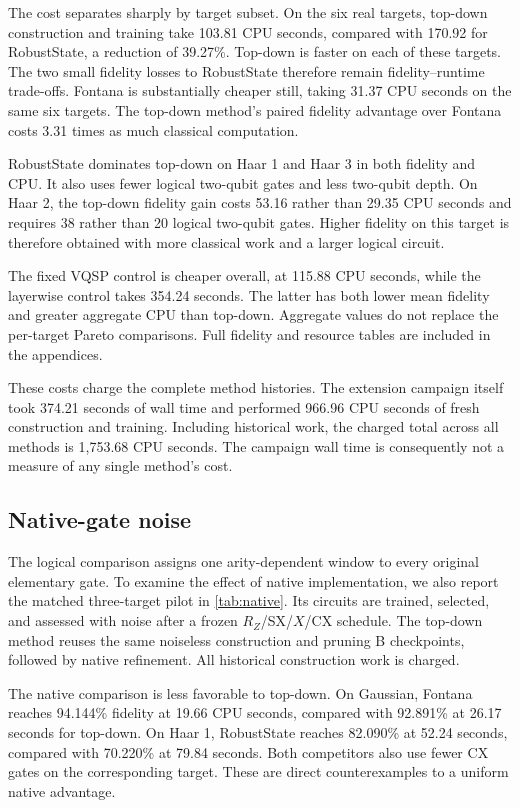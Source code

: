 The cost separates sharply by target subset. On the six real targets,
top-down construction and training take 103.81 CPU seconds, compared with
170.92 for RobustState, a reduction of 39.27\%. Top-down is faster on each
of these targets. The two small fidelity losses to RobustState therefore
remain fidelity--runtime trade-offs. Fontana is substantially cheaper
still, taking 31.37 CPU seconds on the same six targets. The top-down
method's paired fidelity advantage over Fontana costs 3.31 times as much
classical computation.

RobustState dominates top-down on Haar 1 and Haar 3 in both fidelity and
CPU. It also uses fewer logical two-qubit gates and less two-qubit depth.
On Haar 2, the top-down fidelity gain costs 53.16 rather than 29.35 CPU
seconds and requires 38 rather than 20 logical two-qubit gates. Higher
fidelity on this target is therefore obtained with more classical work
and a larger logical circuit.

The fixed VQSP control is cheaper overall, at 115.88 CPU seconds, while
the layerwise control takes 354.24 seconds. The latter has both lower
mean fidelity and greater aggregate CPU than top-down. Aggregate values
do not replace the per-target Pareto comparisons. Full fidelity and
resource tables are included in the appendices.

These costs charge the complete method histories. The extension campaign
itself took 374.21 seconds of wall time and performed 966.96 CPU seconds
of fresh construction and training. Including historical work, the
charged total across all methods is 1,753.68 CPU seconds. The campaign
wall time is consequently not a measure of any single method's cost.

\subsection{Native-gate noise}

The logical comparison assigns one arity-dependent window to every
original elementary gate. To examine the effect of native implementation,
we also report the matched three-target pilot in \cref{tab:native}.
Its circuits are trained, selected, and assessed with noise after a frozen
$R_Z$/SX/$X$/CX schedule. The top-down method reuses the same noiseless
construction and pruning B checkpoints, followed by native refinement.
All historical construction work is charged.



The native comparison is less favorable to top-down. On Gaussian,
Fontana reaches 94.144\% fidelity at 19.66 CPU seconds, compared with
92.891\% at 26.17 seconds for top-down. On Haar 1, RobustState reaches
82.090\% at 52.24 seconds, compared with 70.220\% at 79.84 seconds.
Both competitors also use fewer CX gates on the corresponding target.
These are direct counterexamples to a uniform native advantage.

